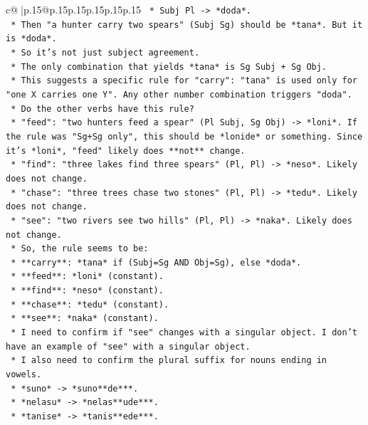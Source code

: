 \documentclass{article}
\begin{document}
{\begin{supertabular}{c@{$\;$}|p{.15\linewidth}@{}p{.15\linewidth}p{.15\linewidth}p{.15\linewidth}p{.15\linewidth}p{.15\linewidth}}
{{{\texttt{            *   Subj Pl {-}> *doda*.} \\
\texttt{            *   Then "a hunter carry two spears" (Subj Sg) should be *tana*. But it is *doda*.} \\
\texttt{            *   So it's not just subject agreement.} \\
\texttt{    *   The only combination that yields *tana* is Sg Subj + Sg Obj.} \\
\texttt{    *   This suggests a specific rule for "carry": "tana" is used only for "one X carries one Y". Any other number combination triggers "doda".} \\
\texttt{    *   Do the other verbs have this rule?} \\
\texttt{        *   "feed": "two hunters feed a spear" (Pl Subj, Sg Obj) {-}> *loni*. If the rule was "Sg+Sg only", this should be *lonide* or something. Since it's *loni*, "feed" likely does **not** change.} \\
\texttt{        *   "find": "three lakes find three spears" (Pl, Pl) {-}> *neso*. Likely does not change.} \\
\texttt{        *   "chase": "three trees chase two stones" (Pl, Pl) {-}> *tedu*. Likely does not change.} \\
\texttt{        *   "see": "two rivers see two hills" (Pl, Pl) {-}> *naka*. Likely does not change.} \\
\texttt{    *   So, the rule seems to be:} \\
\texttt{        *   **carry**: *tana* if (Subj=Sg AND Obj=Sg), else *doda*.} \\
\texttt{        *   **feed**: *loni* (constant).} \\
\texttt{        *   **find**: *neso* (constant).} \\
\texttt{        *   **chase**: *tedu* (constant).} \\
\texttt{        *   **see**: *naka* (constant).} \\
\texttt{    *   I need to confirm if "see" changes with a singular object. I don't have an example of "see" with a singular object.} \\
\texttt{    *   I also need to confirm the plural suffix for nouns ending in vowels.} \\
\texttt{        *   *suno* {-}> *suno**de***.} \\
\texttt{        *   *nelasu* {-}> *nelas**ude***.} \\
\texttt{        *   *tanise* {-}> *tanis**ede***.} \\
}}}
\end{supertabular}}
\end{document}
